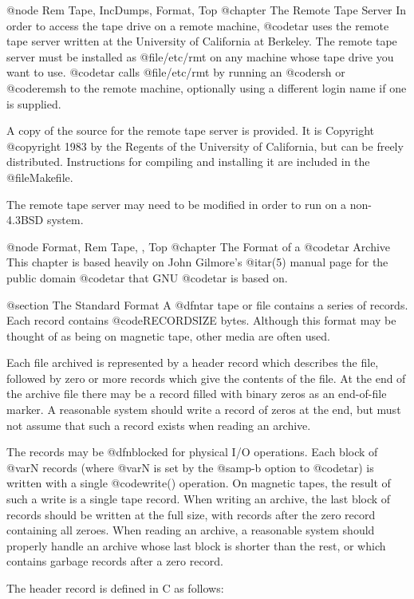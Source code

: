 @node Rem Tape, IncDumps, Format, Top
@chapter The Remote Tape Server
In order to access the tape drive on a remote machine, @code{tar}
uses the remote tape server written at the University of California
at Berkeley.  The remote tape server must be installed as
@file{/etc/rmt} on any machine whose tape drive you want to use.
@code{tar} calls @file{/etc/rmt} by running an @code{rsh} or
@code{remsh} to the remote machine, optionally using a different
login name if one is supplied.

A copy of the source for the remote tape server is provided.  It is
Copyright @copyright 1983 by the Regents of the University of California, but
can be freely distributed.  Instructions for compiling and
installing it are included in the @file{Makefile}.

The remote tape server may need to be modified in order to run on a
non-4.3BSD system.

@node Format, Rem Tape, , Top
@chapter The Format of a @code{tar} Archive
This chapter is based heavily on John Gilmore's @i{tar}(5) manual page
for the public domain @code{tar} that GNU @code{tar} is based on.

@section The Standard Format
A @dfn{tar tape} or file contains a series of records.  Each record
contains @code{RECORDSIZE} bytes.  Although this format may be
thought of as being on magnetic tape, other media are often used.

Each file archived is represented by a header record which describes
the file, followed by zero or more records which give the contents
of the file.  At the end of the archive file there may be a record
filled with binary zeros as an end-of-file marker.  A reasonable
system should write a record of zeros at the end, but must not
assume that such a record exists when reading an archive.

The records may be @dfn{blocked} for physical I/O operations.  Each
block of @var{N} records (where @var{N} is set by the @samp{-b}
option to @code{tar}) is written with a single @code{write()}
operation.  On magnetic tapes, the result of such a write is a
single tape record.  When writing an archive, the last block of
records should be written at the full size, with records after the
zero record containing all zeroes.  When reading an archive, a
reasonable system should properly handle an archive whose last block
is shorter than the rest, or which contains garbage records after a
zero record.

The header record is defined in C as follows:

